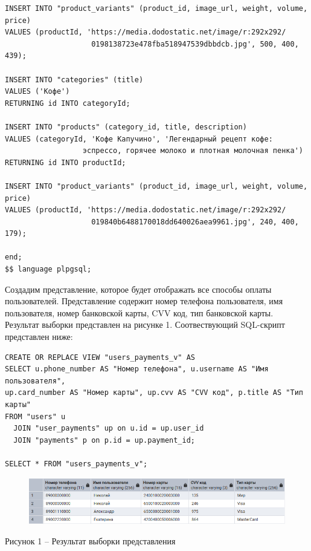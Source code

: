 \documentclass[a4paper,14pt]{extarticle}
\begin{document}
\begin{Verbatim}[tabsize=4,fontsize=\small]
INSERT INTO "product_variants" (product_id, image_url, weight, volume, price)
VALUES (productId, 'https://media.dodostatic.net/image/r:292x292/
                    0198138723e478fba518947539dbbdcb.jpg', 500, 400, 439);

INSERT INTO "categories" (title)
VALUES ('Кофе')
RETURNING id INTO categoryId;

INSERT INTO "products" (category_id, title, description)
VALUES (categoryId, 'Кофе Капучино', 'Легендарный рецепт кофе: 
                  эспрессо, горячее молоко и плотная молочная пенка')
RETURNING id INTO productId;

INSERT INTO "product_variants" (product_id, image_url, weight, volume, price)
VALUES (productId, 'https://media.dodostatic.net/image/r:292x292/
                    019840b6488170018dd640026aea9961.jpg', 240, 400, 179);

end;
$$ language plpgsql;
  \end{Verbatim}

  Создадим представление, которое будет отображать все способы оплаты пользователей. Представление содержит номер телефона пользователя, имя пользователя, номер банковской карты, CVV код, тип банковской карты. Результат выборки представлен на рисунке 1. Соотвествующий SQL-скрипт представлен ниже:

    \noindent
  \begin{Verbatim}[tabsize=4,fontsize=\small]
CREATE OR REPLACE VIEW "users_payments_v" AS
SELECT u.phone_number AS "Номер телефона", u.username AS "Имя пользователя", 
up.card_number AS "Номер карты", up.cvv AS "CVV код", p.title AS "Тип карты"
FROM "users" u
  JOIN "user_payments" up on u.id = up.user_id
  JOIN "payments" p on p.id = up.payment_id;

SELECT * FROM "users_payments_v";
  \end{Verbatim}

  \begin{figure}[h]
    \centering
    \includegraphics[width=1\linewidth]{img/view-1}
  \end{figure}
  \begin{center}
    Рисунок 1 – Результат выборки представления
  \end{center}
\end{document}
